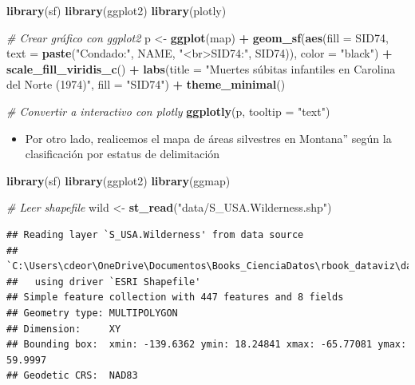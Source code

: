 \documentclass[
]{book}
\newenvironment{Shaded}{\begin{snugshade}}{\end{snugshade}}
\newcommand{\AttributeTok}[1]{\textcolor[rgb]{0.13,0.29,0.53}{#1}}
\newcommand{\CommentTok}[1]{\textcolor[rgb]{0.56,0.35,0.01}{\textit{#1}}}
\newcommand{\FunctionTok}[1]{\textcolor[rgb]{0.13,0.29,0.53}{\textbf{#1}}}
\newcommand{\NormalTok}[1]{#1}
\newcommand{\OtherTok}[1]{\textcolor[rgb]{0.56,0.35,0.01}{#1}}
\newcommand{\SpecialCharTok}[1]{\textcolor[rgb]{0.81,0.36,0.00}{\textbf{#1}}}
\newcommand{\StringTok}[1]{\textcolor[rgb]{0.31,0.60,0.02}{#1}}
\providecommand{\tightlist}{%
  \setlength{\itemsep}{0pt}\setlength{\parskip}{0pt}}
\begin{document}
\begin{Shaded}
\begin{Highlighting}[]
\FunctionTok{library}\NormalTok{(sf)}
\FunctionTok{library}\NormalTok{(ggplot2)}
\FunctionTok{library}\NormalTok{(plotly)}

\CommentTok{\# Crear gráfico con ggplot2}
\NormalTok{p }\OtherTok{\textless{}{-}} \FunctionTok{ggplot}\NormalTok{(map) }\SpecialCharTok{+}
  \FunctionTok{geom\_sf}\NormalTok{(}\FunctionTok{aes}\NormalTok{(}\AttributeTok{fill =}\NormalTok{ SID74, }\AttributeTok{text =} \FunctionTok{paste}\NormalTok{(}\StringTok{"Condado:"}\NormalTok{, NAME, }\StringTok{"\textless{}br\textgreater{}SID74:"}\NormalTok{, SID74)),}
          \AttributeTok{color =} \StringTok{"black"}\NormalTok{) }\SpecialCharTok{+}
  \FunctionTok{scale\_fill\_viridis\_c}\NormalTok{() }\SpecialCharTok{+}
  \FunctionTok{labs}\NormalTok{(}\AttributeTok{title =} \StringTok{"Muertes súbitas infantiles en Carolina del Norte (1974)"}\NormalTok{,}
       \AttributeTok{fill =} \StringTok{"SID74"}\NormalTok{) }\SpecialCharTok{+}
  \FunctionTok{theme\_minimal}\NormalTok{()}

\CommentTok{\# Convertir a interactivo con plotly}
\FunctionTok{ggplotly}\NormalTok{(p, }\AttributeTok{tooltip =} \StringTok{"text"}\NormalTok{)}
\end{Highlighting}
\end{Shaded}

\begin{itemize}
\tightlist
\item
  Por otro lado, realicemos el mapa de áreas silvestres en Montana'' según la clasificación por estatus de delimitación
\end{itemize}

\begin{Shaded}
\begin{Highlighting}[]
\FunctionTok{library}\NormalTok{(sf)}
\FunctionTok{library}\NormalTok{(ggplot2)}
\FunctionTok{library}\NormalTok{(ggmap)}

\CommentTok{\# Leer shapefile}
\NormalTok{wild }\OtherTok{\textless{}{-}} \FunctionTok{st\_read}\NormalTok{(}\StringTok{"data/S\_USA.Wilderness.shp"}\NormalTok{)}
\end{Highlighting}
\end{Shaded}

\begin{verbatim}
## Reading layer `S_USA.Wilderness' from data source 
##   `C:\Users\cdeor\OneDrive\Documentos\Books_CienciaDatos\rbook_dataviz\data\S_USA.Wilderness.shp' 
##   using driver `ESRI Shapefile'
## Simple feature collection with 447 features and 8 fields
## Geometry type: MULTIPOLYGON
## Dimension:     XY
## Bounding box:  xmin: -139.6362 ymin: 18.24841 xmax: -65.77081 ymax: 59.9997
## Geodetic CRS:  NAD83
\end{verbatim}
\end{document}
